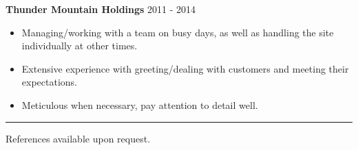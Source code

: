 \documentclass[12pt]{article}
\newlength{\remaining}
\newcommand{\titleline}[1]{
\setlength{\remaining}{\textwidth-\widthof{\textsc{#1}}}
\noindent\underline{\textsc{#1}\hspace*{\remaining}}\par}
\begin{document}
{    \noindent\textbf{Thunder Mountain Holdings} \hfill 2011 - 2014
    \begin{itemize}[noitemsep]
    	\item Managing/working with a team on busy days, as well as handling the site individually at other times.
    	\item Extensive experience with greeting/dealing with customers and meeting their expectations.
    	\item Meticulous when necessary, pay attention to detail well.
    \end{itemize}

    \bigskip
    \hrule
	\bigskip
    \noindent References available upon request. \\
      
}

{\noindent}
\end{document}
